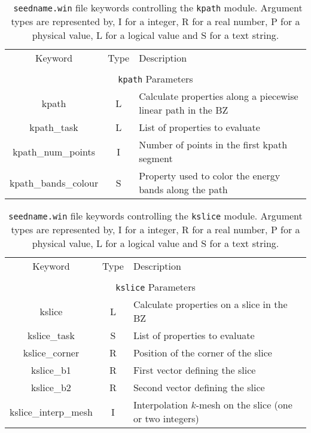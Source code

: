 \begin{table}[hH!]
\begin{center}
\begin{tabular}{|c|c|p{6cm}|}
  \hline
  Keyword & Type & Description \\
  &      &             \\
  \hline\hline
  \multicolumn{3}{|c|}{{\tt kpath} Parameters} \\
  \hline
  {\sc kpath}  & L & Calculate properties along a piecewise linear path in the BZ \\
  {\sc kpath\_task}& L & List of properties to evaluate\\
  {\sc kpath\_num\_points}& I & Number of points in the first kpath segment\\
  {\sc kpath\_bands\_colour}& S & Property used to color the energy bands along the path\\
  \hline
\end{tabular}
\caption[Parameter file keywords controlling the kpath module.]  {{\tt
    seedname.win} file keywords controlling the {\tt kpath}
  module. Argument types are represented by, I for a integer, R for a
  real number, P for a physical value, L for a logical value and S for
  a text string.}
\label{parameter_keywords_kpath}
\end{center}
\end{table}

\begin{table}[hH!]
\begin{center}
\begin{tabular}{|c|c|p{6cm}|}
\hline
Keyword & Type & Description \\
        &      &             \\
\hline\hline
\multicolumn{3}{|c|}{{\tt kslice} Parameters} \\
\hline
{\sc kslice}  & L & Calculate properties on a slice in the BZ \\
{\sc kslice\_task}& S & List of properties to evaluate\\
{\sc kslice\_corner}& R & Position of the corner of the slice\\
{\sc kslice\_b1}& R & First vector defining the slice\\
{\sc kslice\_b2}& R & Second vector defining the slice\\
{\sc kslice\_interp\_mesh}& I & Interpolation $k$-mesh
on the slice (one or two integers)\\
\hline
\end{tabular}
\caption[Parameter file keywords controlling the kslice module.]
{{\tt seedname.win} file keywords controlling the {\tt kslice}
  module. Argument types are represented by, I for a integer, R for a
  real number, P for a physical value, L for a logical value and S for
  a text string.}
\label{parameter_keywords_kslice}
\end{center}
\end{table}



